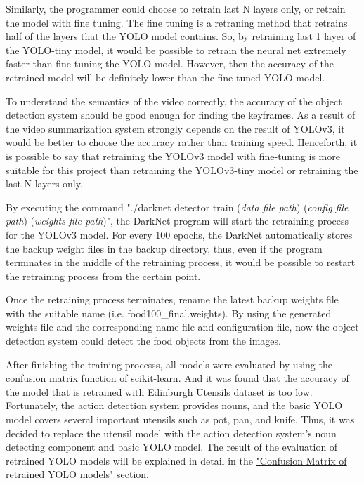 \documentclass{article}
\begin{document}
Similarly, the programmer could choose to retrain last N layers only, or retrain the model with fine tuning. The fine tuning is a retraning method that retrains half of the layers that the YOLO model contains. So, by retraining last 1 layer of the YOLO-tiny model, it would be possible to retrain the neural net extremely faster than fine tuning the YOLO model. However, then the accuracy of the retrained model will be definitely lower than the fine tuned YOLO model.

To understand the semantics of the video correctly, the accuracy of the object detection system should be good enough for finding the keyframes. As a result of the video summarization system strongly depends on the result of YOLOv3, it would be better to choose the accuracy rather than training speed. Henceforth, it is possible to say that retraining the YOLOv3 model with fine-tuning is more suitable for this project than retraining the YOLOv3-tiny model or retraining the last N layers only.

By executing the command "./darknet detector train (\textit{data file path}) (\textit{config file path}) (\textit{weights file path})", the DarkNet program will start the retraining process for the YOLOv3 model. For every 100 epochs, the DarkNet automatically stores the backup weight files in the backup directory, thus, even if the program terminates in the middle of the retraining process, it would be possible to restart the retraining process from the certain point.

Once the retraining process terminates, rename the latest backup weights file with the suitable name (i.e. food100\_final.weights). By using the generated weights file and the corresponding name file and configuration file, now the object detection system could detect the food objects from the images.

After finishing the training processs, all models were evaluated by using the confusion matrix function of scikit-learn. And it was found that the accuracy of the model that is retrained with Edinburgh Utensils dataset is too low. Fortunately, the action detection system provides nouns, and the basic YOLO model covers several important utensils such as pot, pan, and knife. Thus, it was decided to replace the utensil model with the action detection system's noun detecting component and basic YOLO model. The result of the evaluation of retrained YOLO models will be explained in detail in the \hyperlink{evaluate_yolo_with_cm}{"Confusion Matrix of retrained YOLO models"} section.
\end{document}
